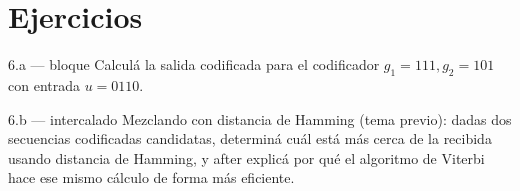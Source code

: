 \documentclass[11pt,openany]{book}
\begin{document}
\section{Ejercicios}

\begin{ejercicio}{6.a — bloque}
Calculá la salida codificada para el codificador $g_1=111, g_2=101$ con entrada $u=0110$.
\end{ejercicio}

\begin{ejercicio}{6.b — intercalado}
Mezclando con distancia de Hamming (tema previo): dadas dos secuencias codificadas candidatas, determiná cuál está más cerca de la recibida usando distancia de Hamming, y after explicá por qué el algoritmo de Viterbi hace ese mismo cálculo de forma más eficiente.
\end{ejercicio}
\end{document}

